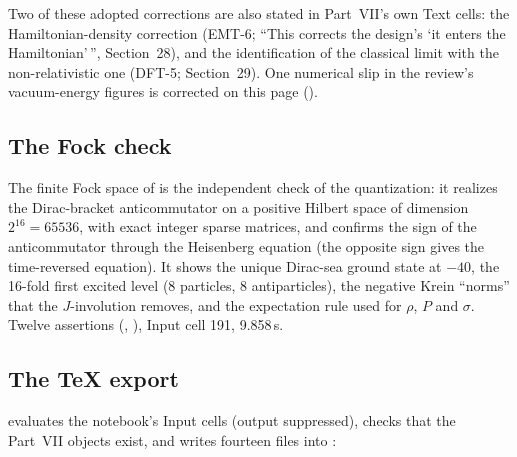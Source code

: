 Two of these adopted corrections are also stated in Part~VII's own Text cells: the
Hamiltonian-density correction (EMT-6; ``This corrects the design's `it enters the Hamiltonian'\,'',
Section~28), and the identification of the classical limit with the non-relativistic one (DFT-5;
Section~29). One numerical slip in the review's vacuum-energy figures is corrected on this page
().

\subsection{The Fock check}
\label{sec:10.5}

The finite Fock space of  is the independent check of the quantization: it realizes
the Dirac-bracket anticommutator on a positive Hilbert space of dimension $2^{16}=65536$, with exact
integer sparse matrices, and confirms the sign of the anticommutator through the Heisenberg equation
(the opposite sign gives the time-reversed equation). It shows the unique Dirac-sea ground state at
$-40$, the 16-fold first excited level (8 particles, 8 antiparticles), the negative Krein ``norms''
that the $J$-involution removes, and the expectation rule used for $\rho$, $P$ and $\sigma$. Twelve
assertions (, ), Input cell 191, 9.858\,s.

\subsection{The TeX export}
\label{sec:10.6}

 evaluates the notebook's Input cells (output
suppressed), checks that the Part~VII objects exist, and writes fourteen files into
:

